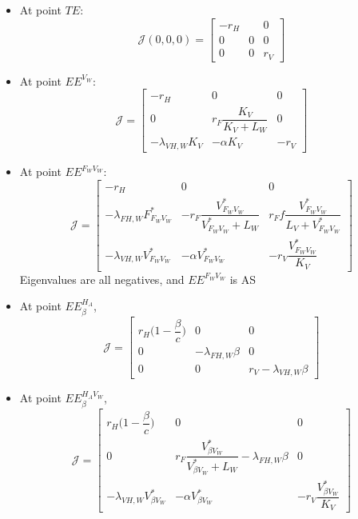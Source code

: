 \documentclass{article}
\newcommand{\lfw}{\lambda_{FH, W}}
\newcommand{\lvw}{\lambda_{VH, W}}
\begin{document}
\begin{itemize}
\item At point $TE$:
\begin{equation}
\mathcal{J}(0,0,0) =
\begin{bmatrix}
-r_H &  & 0 \\
0 & 0 & 0 \\
0 & 0 & r_V
\end{bmatrix}
\end{equation}
\item At point $EE^{V_W}$:
\begin{equation}
\mathcal{J} =
\begin{bmatrix}
-r_H & 0 & 0 \\
0 & r_F \dfrac{K_V}{K_V + L_W} & 0 \\
- \lvw K_V & - \alpha K_V & -r_V
\end{bmatrix}
\end{equation}
\item At point $EE^{F_WV_W}$:
\begin{equation}
\mathcal{J} =
\begin{bmatrix}
-r_H & 0 & 0 \\
-\lfw F_{F_WV_W}^* & -r_F \dfrac{V_{F_WV_W}^*}{V_{F_WV_W}^* +L_W}  & r_F f \dfrac{V_{F_WV_W}^*}{L_V + V_{F_WV_W}^*}\\
-\lvw V_{F_WV_W}^* & - \alpha V_{F_WV_W}^* & -r_V \dfrac{V_{F_WV_W}^*}{K_V}
\end{bmatrix}
\end{equation}
Eigenvalues are all negatives, and $EE^{F_WV_W}$ is AS

\item At point $EE^{H_A}_\beta$,
\begin{equation}
\mathcal{J} =
\begin{bmatrix}
r_H \Big(1 - \dfrac{\beta}{c} \Big) & 0 & 0 \\
0 & -\lfw \beta  & 0 \\
0 & 0 & r_V - \lvw \beta
\end{bmatrix}
\end{equation}

\item At point $EE^{H_AV_W}_\beta$,
\begin{equation}
\mathcal{J} =
\begin{bmatrix}
r_H \Big(1 - \dfrac{\beta}{c} \Big) & 0 & 0 \\
0 & r_F \dfrac{V^*_{\beta V_W}}{V^*_{\beta V_W} + L_W} -\lfw \beta  & 0 \\
-\lvw V^*_{\beta V_W} & -\alpha V^*_{\beta V_W} & -r_V \dfrac{V^*_{\beta V_W}}{K_V}
\end{bmatrix}
\end{equation}


\end{itemize}
\end{document}
